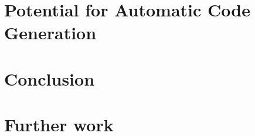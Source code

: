 \section{Potential for Automatic Code Generation}
\label{sec:disq_automatic_code}

\section{Conclusion}
\label{sec:conclusion}

\section{Further work}
\label{sec:further_work}
